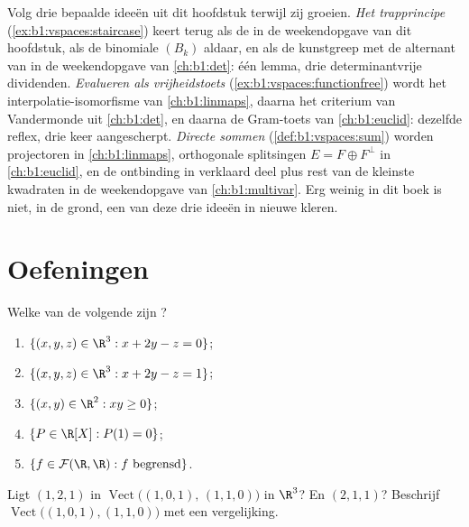 \begin{remark}
\label{rem:b1:vspaces:threads}
Volg drie bepaalde ideeën uit dit hoofdstuk terwijl zij groeien.
\emph{Het trapprincipe} (\cref{ex:b1:vspaces:staircase}) keert
terug als de  in de weekendopgave van dit hoofdstuk,
als de binomiale  $(B_k)$ aldaar, en als de kunstgreep met de
alternant van  in de weekendopgave van
\cref{ch:b1:det}: één lemma, drie determinantvrije dividenden.
\emph{Evalueren als vrijheidstoets}
(\cref{ex:b1:vspaces:functionfree}) wordt het
interpolatie-isomorfisme van \cref{ch:b1:linmaps}, daarna het
criterium van Vandermonde uit \cref{ch:b1:det}, en daarna de
Gram-toets van \cref{ch:b1:euclid}: dezelfde reflex, drie keer
aangescherpt. \emph{Directe sommen}
(\cref{def:b1:vspaces:sum}) worden projectoren in
\cref{ch:b1:linmaps}, orthogonale splitsingen $E = F \oplus
F^\perp$ in \cref{ch:b1:euclid}, en de ontbinding in verklaard
deel plus rest van de kleinste kwadraten in de weekendopgave van
\cref{ch:b1:multivar}. Erg weinig in dit boek is niet, in de
grond, een van deze drie ideeën in nieuwe kleren.
\end{remark}

\section{Oefeningen}

\begin{exercise}[$\star$]\label{exo:b1:vspaces:1}
Welke van de volgende  zijn ?
\begin{enumerate}
  \item $\{(x, y, z) \in \R^3 : x + 2y - z = 0\}$;
  \item $\{(x, y, z) \in \R^3 : x + 2y - z = 1\}$;
  \item $\{(x, y) \in \R^2 : xy \geq 0\}$;
  \item $\{P \in \R[X] : P(1) = 0\}$;
  \item $\{f \in \mathcal{F}(\R,\R) : f \text{ begrensd}\}$.
\end{enumerate}
\end{exercise}

\begin{exercise}[$\star$]\label{exo:b1:vspaces:2}
Ligt $(1, 2, 1)$ in $\operatorname{Vect}\bigl((1,0,1),\,
(1,1,0)\bigr)$ in $\R^3$? En $(2, 1, 1)$? Beschrijf
$\operatorname{Vect}\bigl((1,0,1),(1,1,0)\bigr)$ met een
vergelijking.
\end{exercise}


